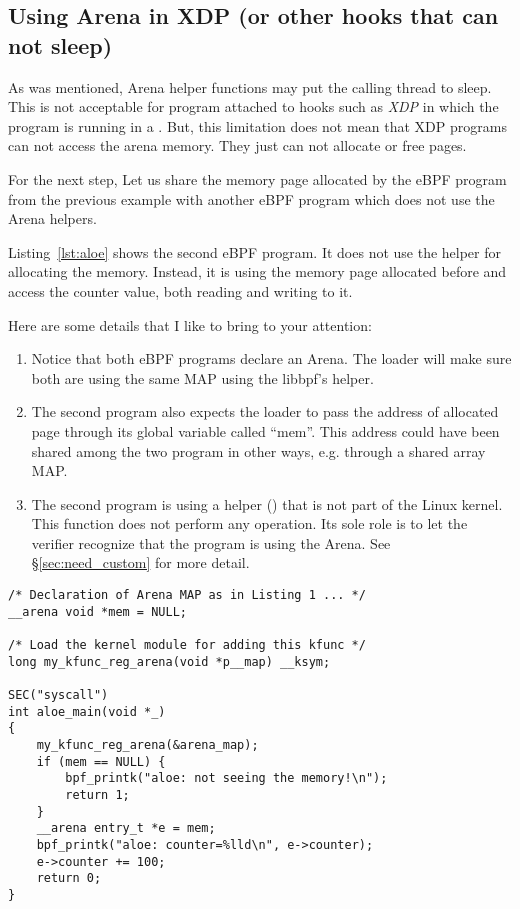 \documentclass{article}
\begin{document}
\subsection{Using Arena in XDP (or other hooks that can not sleep)}

As was mentioned, Arena helper functions may put the calling thread to sleep.
This is not acceptable for program attached to hooks such as \emph{XDP} in
which the program is running in a . But, this limitation does not mean
that XDP programs can not access the arena memory. They just can not allocate or
free pages.

For the next step, Let us share the memory page allocated by the eBPF program
from the previous example with another eBPF program which does not use the Arena
helpers.

Listing~\ref{lst:aloe} shows the second eBPF program. It does not use the
 helper for allocating the memory. Instead, it is
using the memory page allocated before and access the counter value, both
reading and writing to it.

Here are some details that I like to bring to your attention:
\begin{enumerate}
    \item Notice that both eBPF programs declare an Arena. The loader will
        make sure both are using the same MAP using the libbpf's
         helper.
    \item The second program also expects the loader to pass the address of
        allocated page through its global variable called ``mem''. This address
        could have been shared among the two program in other ways, e.g.
        through a shared array MAP\@.
    \item The second program is using a helper () that is
        not part of the Linux kernel. This function does not perform any
        operation. Its sole role is to let the verifier recognize that the
        program is using the Arena. See \S\ref{sec:need_custom} for more detail.
\end{enumerate}

\begin{minipage}{\linewidth}
\begin{flushleft}
\begin{lstlisting}[caption={An eBPF program that uses Arena pages allocated from another program}, label={lst:aloe}]
/* Declaration of Arena MAP as in Listing 1 ... */
__arena void *mem = NULL;

/* Load the kernel module for adding this kfunc */
long my_kfunc_reg_arena(void *p__map) __ksym;

SEC("syscall")
int aloe_main(void *_)
{
    my_kfunc_reg_arena(&arena_map);
    if (mem == NULL) {
        bpf_printk("aloe: not seeing the memory!\n");
        return 1;
    }
    __arena entry_t *e = mem;
    bpf_printk("aloe: counter=%lld\n", e->counter);
    e->counter += 100;
    return 0;
}
\end{lstlisting}
\end{flushleft}
\end{minipage}
\end{document}
